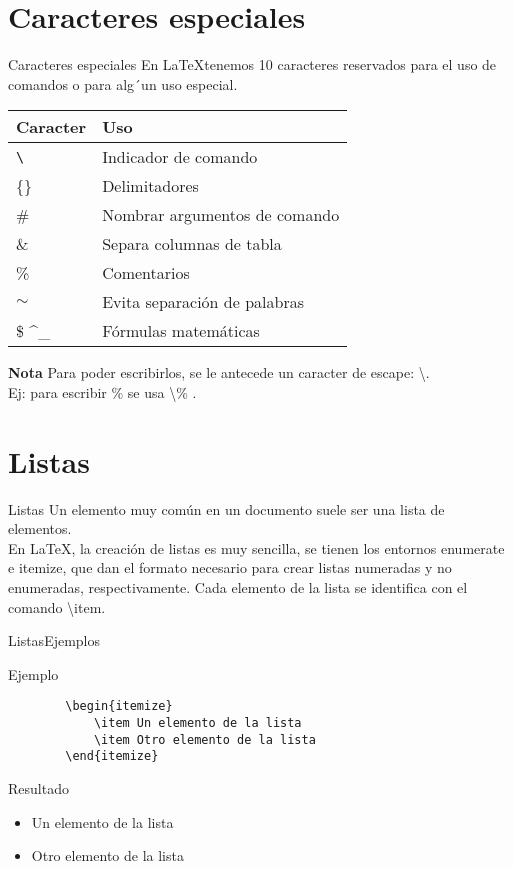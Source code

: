 \documentclass[10pt,xcolor={dvipsnames}]{beamer}
\begin{document}
\section{Caracteres especiales}
\begin{frame}{Caracteres especiales}{}
En \LaTeX tenemos 10 caracteres reservados para el uso de comandos o para alg´un uso especial.
\begin{center}
	\begin{tabular}{ll}
		Caracter & Uso \\
		\hline
		{\tt\textbackslash } & Indicador de comando\\ 
		{\{\}} & Delimitadores\\
		{\#} &  Nombrar argumentos de comando\\
		{\&}& Separa columnas de tabla\\
		{\%}& Comentarios \\
		{$\sim$}& Evita separación de palabras\\
		{\$ \textasciicircum \_}& Fórmulas matemáticas\\
	\end{tabular}
\end{center}
\textbf{Nota}
Para poder escribirlos, se le antecede un caracter de escape: {\textbackslash}.\\
Ej: para escribir {\%} se usa \textbackslash{\%} .
\end{frame}

\section{Listas}
\begin{frame}{Listas}{}
Un elemento muy común en un documento suele ser una lista
de elementos.\\
En \LaTeX, la creación de listas es muy sencilla, se tienen los entornos enumerate e itemize, que dan el formato necesario para crear listas numeradas y no enumeradas, respectivamente. Cada elemento de la lista se identifica con el comando \textbackslash item.
\end{frame}

\begin{frame}[fragile]{Listas}{Ejemplos}
\begin{exampleblock}{Ejemplo}
	\begin{verbatim}
		\begin{itemize}
			\item Un elemento de la lista
			\item Otro elemento de la lista
		\end{itemize}
	\end{verbatim}
\end{exampleblock}

\begin{block}{Resultado}
	\begin{itemize}
		\item Un elemento de la lista
		\item Otro elemento de la lista
	\end{itemize}
\end{block}
\end{frame}
\end{document}
